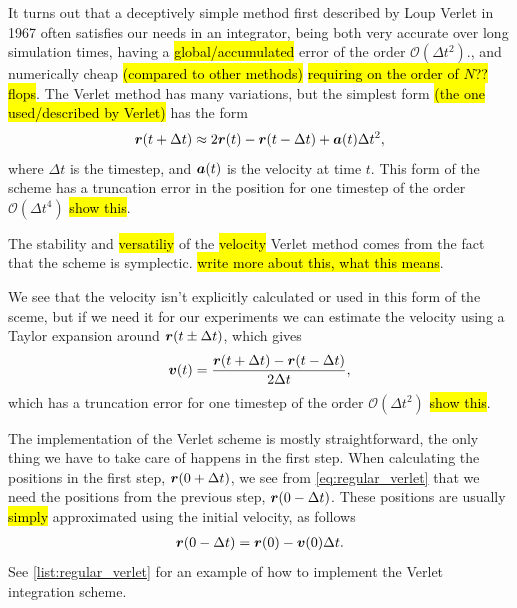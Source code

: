 It turns out that a deceptively simple method first described by Loup Verlet in 1967\cite{verlet1967computer} often satisfies our needs in an integrator, being both very accurate over long simulation times, having a \hl{global/accumulated} error of the order $\mathcal{O}(\Delta t^2)$., and numerically cheap \hl{(compared to other methods)} \hl{requiring on the order of $N$?? flops}. The Verlet method has many variations, but the simplest form \hl{(the one used/described by Verlet)} has the form
\begin{align}
    \boldsymbol{r}(t + \Delta t) \approx 2\boldsymbol{r}(t) - \boldsymbol{r}(t - \Delta t) + \boldsymbol{a}(t)\Delta t^2,
    \label{eq:regular_verlet}
\end{align}
where $\Delta t$ is the timestep, and $\boldsymbol{a}(t)$ is the velocity at time $t$. This form of the scheme has a truncation error in the position for one timestep of the order $\mathcal{O}(\Delta t^4)$ \hl{show this}.

The stability and \hl{versatiliy} of the \hl{velocity} Verlet method comes from the fact that the scheme is symplectic. \hl{write more about this, what this means}.

We see that the velocity isn't explicitly calculated or used in this form of the sceme, but if we need it for our experiments we can estimate the velocity using a Taylor expansion around $\boldsymbol{r}(t\pm\Delta t)$, which gives
\begin{align*}
    \boldsymbol{v}(t) = \frac{\boldsymbol{r}(t + \Delta t) - \boldsymbol{r}(t - \Delta t)}{2\Delta t},
\end{align*}
which has a truncation error for one timestep of the order $\mathcal{O}(\Delta t^2)$ \hl{show this}. 

The implementation of the Verlet scheme is mostly straightforward, the only thing we have to take care of happens in the first step. When calculating the positions in the first step, $\boldsymbol{r}(0+\Delta t)$, we see from \cref{eq:regular_verlet} that we need the positions from the previous step, $\boldsymbol{r}(0-\Delta t)$. These positions are usually \hl{simply} approximated using the initial velocity, as follows
\begin{align*}
    \boldsymbol{r}(0-\Delta t) = \boldsymbol{r}(0) - \boldsymbol{v}(0)\Delta t.
\end{align*}
See \cref{list:regular_verlet} for an example of how to implement the Verlet integration scheme.

